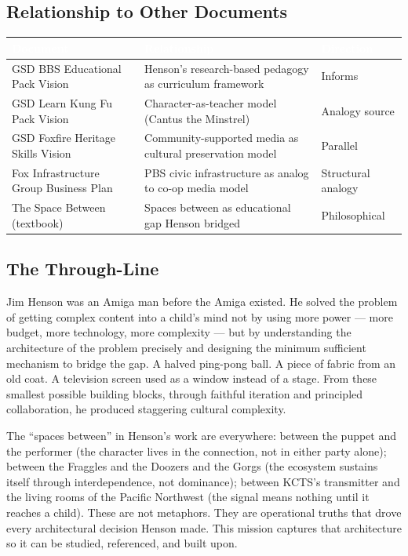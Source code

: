 \documentclass[11pt,letterpaper]{article}
\newcommand{\tableheader}[1]{\textbf{\sffamily\textcolor{white}{#1}}}
\begin{document}
\subsection{Relationship to Other Documents}

\begin{center}
\begin{tabularx}{\textwidth}{L{4.5cm}L{4.5cm}X}
\toprule
{}
\tableheader{Document} & \tableheader{Relationship} & \tableheader{Direction} \\
\midrule
GSD BBS Educational Pack Vision & Henson's research-based pedagogy as curriculum framework & Informs \\
GSD Learn Kung Fu Pack Vision & Character-as-teacher model (Cantus the Minstrel) & Analogy source \\
GSD Foxfire Heritage Skills Vision & Community-supported media as cultural preservation model & Parallel \\
Fox Infrastructure Group Business Plan & PBS civic infrastructure as analog to co-op media model & Structural analogy \\
The Space Between (textbook) & Spaces between as educational gap Henson bridged & Philosophical \\
\bottomrule
\end{tabularx}
\end{center}

\subsection{The Through-Line}

Jim Henson was an Amiga man before the Amiga existed. He solved the problem of getting complex content into a child's mind not by using more power --- more budget, more technology, more complexity --- but by understanding the architecture of the problem precisely and designing the minimum sufficient mechanism to bridge the gap. A halved ping-pong ball. A piece of fabric from an old coat. A television screen used as a window instead of a stage. From these smallest possible building blocks, through faithful iteration and principled collaboration, he produced staggering cultural complexity.

The ``spaces between'' in Henson's work are everywhere: between the puppet and the performer (the character lives in the connection, not in either party alone); between the Fraggles and the Doozers and the Gorgs (the ecosystem sustains itself through interdependence, not dominance); between KCTS's transmitter and the living rooms of the Pacific Northwest (the signal means nothing until it reaches a child). These are not metaphors. They are operational truths that drove every architectural decision Henson made. This mission captures that architecture so it can be studied, referenced, and built upon.
\end{document}
